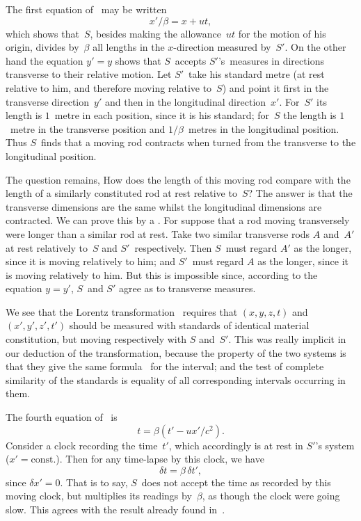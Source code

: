 \documentclass[12pt]{book}
\begin{document}
The first equation of~ may be written
\[
x'/\beta = x + ut,
\]
which shows that~$S$, besides making the allowance~$ut$ for the motion of his
origin, divides by~$\beta$ all lengths in the $x$-direction measured by~$S'$. On the
other hand the equation $y' = y$ shows that $S$~accepts $S'$'s~measures in directions
transverse to their relative motion. Let $S'$~take his standard metre
(at rest relative to him, and therefore moving relative to~$S$) and point it first
in the transverse direction~$y'$ and then in the longitudinal direction~$x'$. For~$S'$
its length is $1$~metre in each position, since it is his standard; for~$S$ the
length is $1$~metre in the transverse position and $1/\beta$~metres in the longitudinal
position. Thus $S$~finds that a moving rod contracts when turned from the
transverse to the longitudinal position.

The question remains, How does the length of this moving rod compare
with the length of a similarly constituted rod at rest relative to~$S$? The
answer is that the transverse dimensions are the same whilst the longitudinal
dimensions are contracted. We can prove this by a .
For suppose that a rod moving transversely were longer than a similar rod at
rest. Take two similar transverse rods $A$ and~$A'$ at rest relatively to~$S$ and
$S'$~respectively. Then $S$~must regard $A'$ as the longer, since it is moving
relatively to him; and $S'$~must regard $A$ as the longer, since it is moving
relatively to him. But this is impossible since, according to the equation
$y = y'$, $S$~and $S'$ agree as to transverse measures.

We see that the Lorentz transformation~ requires that $(x, y, z, t)$ and
$(x', y', z', t')$ should be measured with standards of identical material constitution,
but moving respectively with $S$ and~$S'$. This was really implicit in our
deduction of the transformation, because the property of the two systems
is that they give the same formula~ for the interval; and the test of
complete similarity of the standards is equality of all corresponding intervals
occurring in them.

The fourth equation of~ is
%
\[
t = \beta (t' - ux'/c^2).
\]
Consider a clock recording the time~$t'$, which accordingly is at rest in $S'$'s
system ($x' = \text{const.}$). Then for any time-lapse by this clock, we have
\[
\delta t = \beta\, \delta t',
\]
since $\delta x' = 0$. That is to say, $S$~does not accept the time as recorded by this
moving clock, but multiplies its readings by~$\beta$, as though the clock were
going slow. This agrees with the result already found in~.
\end{document}
